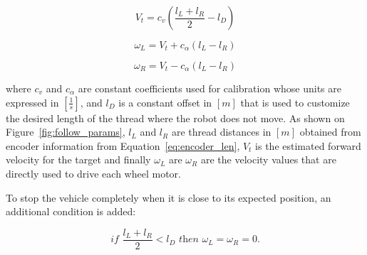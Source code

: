 \documentclass[journal]{IEEEtran}
\begin{document}
\begin{equation}
V_t = c_v (\frac{l_L + l_R}{2} - l_D)
\label{eq:lemniscata}
\end{equation}

\begin{equation}
\omega_{L} = V_t + c_{\alpha} (l_L - l_R)
\label{eq:lemniscata2}
\end{equation}

\begin{equation}
\omega_{R} = V_t - c_{\alpha} (l_L - l_R)
\label{eq:lemniscata3}
\end{equation}

\noindent where  $c_v$ and $c_{\alpha}$ are constant coefficients used for calibration whose units are expressed in $[\frac{1}{s}]$, and $l_D$ is a constant offset in $[m]$ that is used to customize the desired length of the thread where the robot does not move.   As shown on Figure~\ref{fig:follow_params},  $l_L$ and $l_R$ are thread distances in $[m]$  obtained from encoder information from Equation~\ref{eq:encoder_len}, $V_t$ is the estimated forward velocity for the target and finally $\omega_{L}$ are $\omega_{R}$ are the velocity values that are directly used to drive each wheel motor.

To stop the vehicle completely when it is close to its expected position, an additional condition is added: 

\begin{equation}
\textit{if  }{\frac{l_L + l_R}{2} < l_D}\textit{ then } \omega_{L} = \omega_{R} = 0.
\end{equation}
\end{document}
